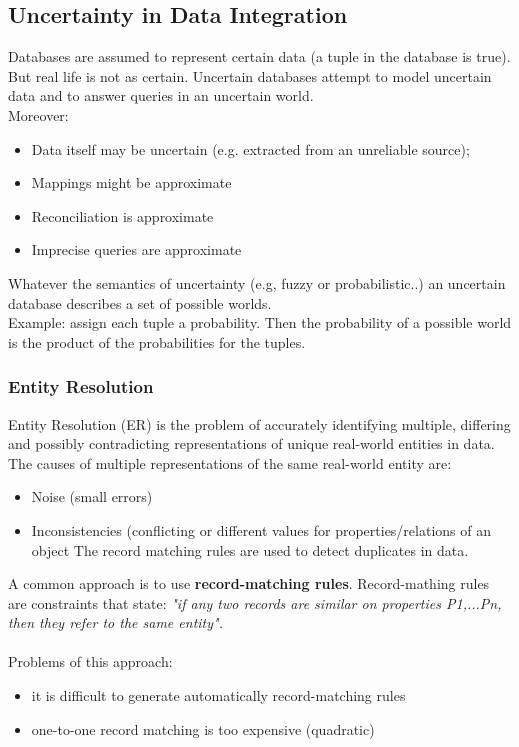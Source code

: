 \documentclass[10pt,a4paper]{article}
\newcommand{\nline}{\\~\\}
\begin{document}
\begin{justify}
\subsection{Uncertainty in Data Integration}
Databases are assumed to represent certain data (a tuple in the database is true). But real life is not as certain. Uncertain databases attempt to model uncertain data and to answer queries in an uncertain world. \\Moreover:
\begin{itemize}
	\item Data itself may be uncertain (e.g. extracted from an unreliable source);
	\item Mappings might be approximate
	\item Reconciliation is approximate
	\item Imprecise queries are approximate
\end{itemize}
Whatever the semantics of uncertainty (e.g, fuzzy or probabilistic..) an uncertain database describes a set of possible worlds. \\
Example: assign each tuple a probability. Then the probability of a possible world is the product of the probabilities for the tuples.
\subsubsection{Entity Resolution}
Entity Resolution (ER) is the problem of accurately identifying multiple, differing and possibly contradicting representations of unique real-world entities in data. \\
The causes of multiple representations of the same real-world entity are:
\begin{itemize}
	\item Noise (small errors)
	\item Inconsistencies (conflicting or different values for properties/relations of an object The record matching rules are used to detect duplicates in data.
\end{itemize}
A common approach is to use \textbf{record-matching rules}. Record-mathing rules are constraints that state: \textit{"if any two records are similar on properties P1,...Pn, then they refer to the same entity".} \nline
Problems of this approach:
\begin{itemize}
	\item it is difficult to generate automatically record-matching rules
	\item one-to-one record matching is too expensive (quadratic)
\end{itemize}

\end{justify}
\end{document}
